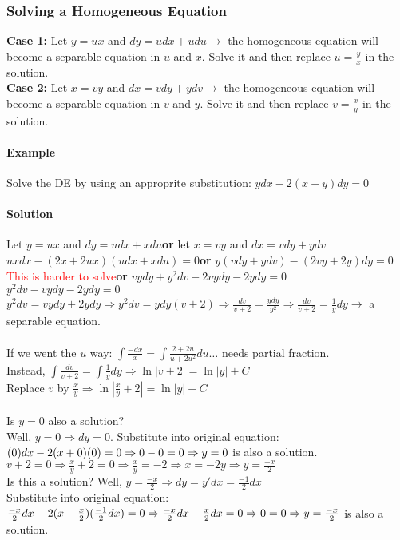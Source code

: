 \documentclass{article}
\begin{document}
\subsubsection{Solving a Homogeneous Equation}
\textbf{Case 1:} Let $y=ux$ and $dy=udx+udu\to$ the homogeneous equation will become a separable equation in $u$ and $x$.
Solve it and then replace $u=\frac{y}{x}$ in the solution.
\\\textbf{Case 2:} Let $x=vy$ and $dx=vdy+ydv\to$ the homogeneous equation will become a separable equation in $v$ and $y$.
Solve it and then replace $v=\frac{x}{y}$ in the solution.

\newpage\paragraph{Example} Solve the DE by using an approprite substitution: $ydx-2(x+y)dy=0$
\paragraph{Solution} Let $y=ux$ and $dy=udx+xdu$\qquad\textbf{or} let $x=vy$ and $dx=vdy+ydv$
\\$uxdx-(2x+2ux)(udx+xdu)=0$\qquad\qquad\qquad\textbf{or} $y(vdy+ydv)-(2vy+2y)dy=0$
\\\textcolor{red}{This is harder to solve}\qquad\qquad\qquad\qquad\qquad\qquad\textbf{or} $vydy+y^2dv-2vydy-2ydy=0$
\\$y^2dv-vydy-2ydy=0$
\\$y^2dv=vydy+2ydy\Rightarrow y^2dv=ydy(v+2)\Rightarrow\frac{dv}{v+2}=\frac{ydy}{y^2}\Rightarrow\frac{dv}{v+2}=\frac{1}{y}dy\to$ a separable equation.
\\\\If we went the $u$ way: $\int\frac{-dx}{x}=\int\frac{2+2u}{u+2u^2}du\dots$ needs partial fraction.
\\Instead, $\int\frac{dv}{v+2}=\int\frac{1}{y}dy\Rightarrow \ln|v+2|=\ln|y|+C$
\\Replace $v$ by $\frac{x}{y}\Rightarrow\ln|\frac{x}{y}+2|=\ln|y|+C$
\\\\Is $y=0$ also a solution?
\\Well, $y=0\Rightarrow dy=0$. Substitute into original equation: $(0)dx-2(x+0)(0)=0\Rightarrow0-0=0\\\Rightarrow y=0$ is also a solution.
\\$v+2=0\Rightarrow\frac{x}{y}+2=0\Rightarrow\frac{x}{y}=-2\Rightarrow x=-2y\Rightarrow y=\frac{-x}{2}$
\\Is this a solution? Well, $y=\frac{-x}{2}\Rightarrow dy=y'dx=\frac{-1}{2}dx$
\\Substitute into original equation: $\frac{-x}{2}dx-2(x-\frac{x}{2})(\frac{-1}{2}dx)=0\Rightarrow
\frac{-x}{2}dx+\frac{x}{2}dx=0\Rightarrow0=0\\\Rightarrow y=\frac{-x}{2}$ is also a solution.
\end{document}
